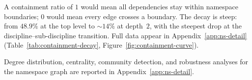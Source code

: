 A containment ratio of $1$ would mean all dependencies stay within namespace boundaries; $0$ would mean every edge crosses a boundary. The decay is steep: from $48.9\%$ at the top level to ${\sim}14\%$ at depth~$2$, with the steepest drop at the discipline--sub-discipline transition. Full data appear in Appendix~\ref{app:ns-detail} (Table~\ref{tab:containment-decay}, Figure~\ref{fig:containment-curve}).

Degree distribution, centrality, community detection, and robustness analyses for the namespace graph are reported in Appendix~\ref{app:ns-detail}.

